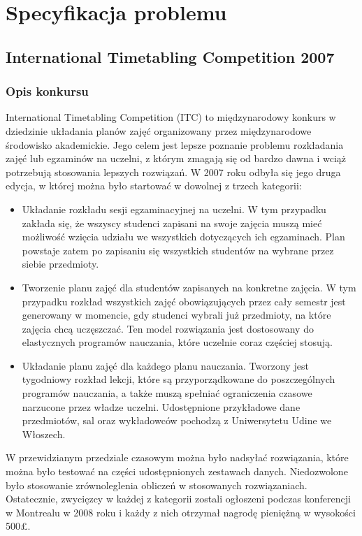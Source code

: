 \chapter{Specyfikacja problemu}
\section{International Timetabling Competition 2007}
\subsection{Opis konkursu}
\par International Timetabling Competition (ITC) to międzynarodowy konkurs w dziedzinie układania planów zajęć organizowany przez międzynarodowe środowisko akademickie. Jego celem jest lepsze poznanie problemu rozkładania zajęć lub egzaminów na uczelni, z którym zmagają się od bardzo dawna i wciąż potrzebują stosowania lepszych rozwiązań. W 2007 roku odbyła się jego druga edycja, w której można było startować w dowolnej z trzech kategorii: 
\begin{itemize}
\item Układanie rozkładu sesji egzaminacyjnej na uczelni. W tym przypadku zakłada się, że wszyscy studenci zapisani na swoje zajęcia muszą mieć możliwość wzięcia udziału we wszystkich dotyczących ich egzaminach. Plan powstaje zatem po zapisaniu się wszystkich studentów na wybrane przez siebie przedmioty.
\item Tworzenie planu zajęć dla studentów zapisanych na konkretne zajęcia. W tym przypadku rozkład wszystkich zajęć obowiązujących przez cały semestr jest generowany w momencie, gdy studenci wybrali już przedmioty, na które zajęcia chcą uczęszczać. Ten model rozwiązania jest dostosowany do elastycznych programów nauczania, które uczelnie coraz częściej stosują.
\item Układanie planu zajęć dla każdego planu nauczania. Tworzony jest tygodniowy rozkład lekcji, które są przyporządkowane do poszczególnych programów nauczania, a także muszą spełniać ograniczenia czasowe narzucone przez władze uczelni. Udostępnione przykładowe dane przedmiotów, sal oraz wykładowców pochodzą z Uniwersytetu Udine we Włoszech.
\end{itemize}
W przewidzianym przedziale czasowym można było nadsyłać rozwiązania, które można było testować na części udostępnionych zestawach danych. Niedozwolone było stosowanie zrównoleglenia obliczeń w stosowanych rozwiązaniach. Ostatecznie, zwycięzcy w każdej z kategorii zostali ogłoszeni podczas konferencji w Montrealu w 2008 roku i każdy z nich otrzymał nagrodę pieniężną w wysokości 500\pounds .
